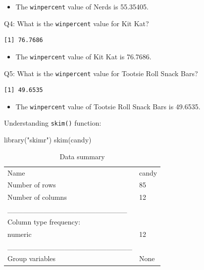 \documentclass[
  letterpaper,
  DIV=11,
  numbers=noendperiod]{scrartcl}
\newenvironment{Shaded}{\begin{snugshade}}{\end{snugshade}}
\newcommand{\FunctionTok}[1]{\textcolor[rgb]{0.28,0.35,0.67}{#1}}
\newcommand{\NormalTok}[1]{\textcolor[rgb]{0.00,0.23,0.31}{#1}}
\newcommand{\SpecialCharTok}[1]{\textcolor[rgb]{0.37,0.37,0.37}{#1}}
\newcommand{\StringTok}[1]{\textcolor[rgb]{0.13,0.47,0.30}{#1}}
\providecommand{\tightlist}{%
  \setlength{\itemsep}{0pt}\setlength{\parskip}{0pt}}\usepackage{longtable,booktabs,array}
\begin{document}
\begin{itemize}
\tightlist
\item
  The \texttt{winpercent} value of Nerds is 55.35405.
\end{itemize}

Q4: What is the \texttt{winpercent} value for Kit Kat?

\begin{Shaded}
\end{Shaded}

\begin{verbatim}
[1] 76.7686
\end{verbatim}

\begin{itemize}
\tightlist
\item
  The \texttt{winpercent} value of Kit Kat is 76.7686.
\end{itemize}

Q5: What is the \texttt{winpercent} value for Tootsie Roll Snack Bars?

\begin{Shaded}
\end{Shaded}

\begin{verbatim}
[1] 49.6535
\end{verbatim}

\begin{itemize}
\tightlist
\item
  The \texttt{winpercent} value of Tootsie Roll Snack Bars is 49.6535.
\end{itemize}

Understanding \texttt{skim()} function:

\begin{Shaded}
\begin{Highlighting}[]
\FunctionTok{library}\NormalTok{(}\StringTok{"skimr"}\NormalTok{)}
\FunctionTok{skim}\NormalTok{(candy)}
\end{Highlighting}
\end{Shaded}

\begin{longtable}[]{@{}ll@{}}
\caption{Data summary}\tabularnewline
\toprule\noalign{}
\endfirsthead
\endhead
\bottomrule\noalign{}
\endlastfoot
Name & candy \\
Number of rows & 85 \\
Number of columns & 12 \\
\_\_\_\_\_\_\_\_\_\_\_\_\_\_\_\_\_\_\_\_\_\_\_ & \\
Column type frequency: & \\
numeric & 12 \\
\_\_\_\_\_\_\_\_\_\_\_\_\_\_\_\_\_\_\_\_\_\_\_\_ & \\
Group variables & None \\
\end{longtable}
\end{document}
